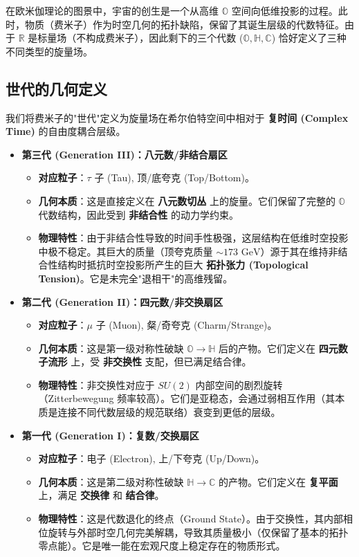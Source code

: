 在欧米伽理论的图景中，宇宙的创生是一个从高维 $\mathbb{O}$ 空间向低维投影的过程。此时，物质（费米子）作为时空几何的拓扑缺陷，保留了其诞生层级的代数特征。由于 $\mathbb{R}$ 是标量场（不构成费米子），因此剩下的三个代数 ($\mathbb{O}, \mathbb{H}, \mathbb{C}$) 恰好定义了三种不同类型的旋量场。

\subsection{世代的几何定义}

我们将费米子的"世代"定义为旋量场在希尔伯特空间中相对于 \textbf{复时间 (Complex Time)} 的自由度耦合层级。

\begin{itemize}
\item \textbf{第三代 (Generation III)：八元数/非结合扇区}
  \begin{itemize}
  \item \textbf{对应粒子}：$\tau$ 子 (Tau), 顶/底夸克 (Top/Bottom)。
  \item \textbf{几何本质}：这是直接定义在 \textbf{八元数切丛} 上的旋量。它们保留了完整的 $\mathbb{O}$ 代数结构，因此受到 \textbf{非结合性} 的动力学约束。
  \item \textbf{物理特性}：由于非结合性导致的时间手性极强，这层结构在低维时空投影中极不稳定。其巨大的质量（顶夸克质量 $\sim 173 \text{ GeV}$）源于其在维持非结合性结构时抵抗时空投影所产生的巨大 \textbf{拓扑张力 (Topological Tension)}。它是未完全"退相干"的高维残留。
  \end{itemize}

\item \textbf{第二代 (Generation II)：四元数/非交换扇区}
  \begin{itemize}
  \item \textbf{对应粒子}：$\mu$ 子 (Muon), 粲/奇夸克 (Charm/Strange)。
  \item \textbf{几何本质}：这是第一级对称性破缺 $\mathbb{O} \to \mathbb{H}$ 后的产物。它们定义在 \textbf{四元数子流形} 上，受 \textbf{非交换性} 支配，但已满足结合律。
  \item \textbf{物理特性}：非交换性对应于 $SU(2)$ 内部空间的剧烈旋转（Zitterbewegung 频率较高）。它们是亚稳态，会通过弱相互作用（其本质是连接不同代数层级的规范联络）衰变到更低的层级。
  \end{itemize}

\item \textbf{第一代 (Generation I)：复数/交换扇区}
  \begin{itemize}
  \item \textbf{对应粒子}：电子 (Electron), 上/下夸克 (Up/Down)。
  \item \textbf{几何本质}：这是第二级对称性破缺 $\mathbb{H} \to \mathbb{C}$ 的产物。它们定义在 \textbf{复平面} 上，满足 \textbf{交换律} 和 \textbf{结合律}。
  \item \textbf{物理特性}：这是代数退化的终点（Ground State）。由于交换性，其内部相位旋转与外部时空几何完美解耦，导致其质量极小（仅保留了基本的拓扑零点能）。它是唯一能在宏观尺度上稳定存在的物质形式。
  \end{itemize}
\end{itemize}

